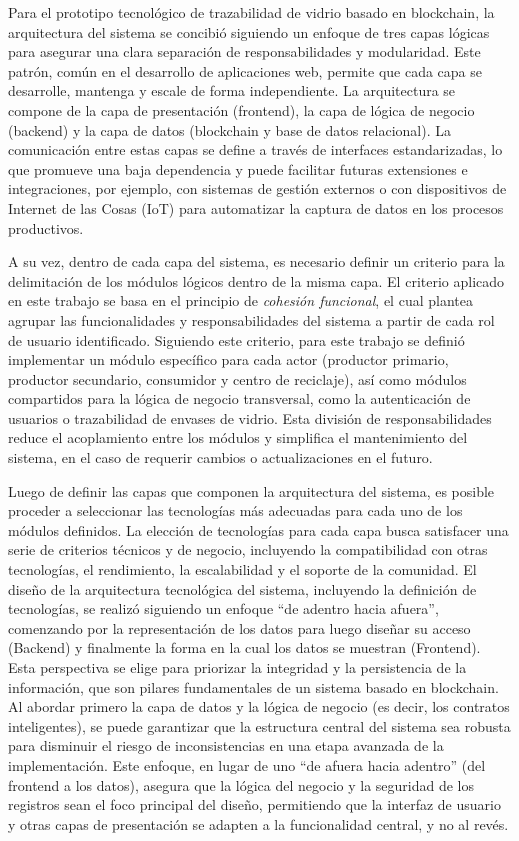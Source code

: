 Para el prototipo tecnológico de trazabilidad de vidrio basado en blockchain, la arquitectura del sistema se concibió siguiendo un enfoque de tres capas lógicas para asegurar una clara separación de responsabilidades y modularidad. Este patrón, común en el desarrollo de aplicaciones web, permite que cada capa se desarrolle, mantenga y escale de forma independiente. La arquitectura se compone de la capa de presentación (frontend), la capa de lógica de negocio (backend) y la capa de datos (blockchain y base de datos relacional). La comunicación entre estas capas se define a través de interfaces estandarizadas, lo que promueve una baja dependencia y puede facilitar futuras extensiones e integraciones, por ejemplo, con sistemas de gestión externos o con dispositivos de Internet de las Cosas (IoT) para automatizar la captura de datos en los procesos productivos.

A su vez, dentro de cada capa del sistema, es necesario definir un criterio para la delimitación de los módulos lógicos dentro de la misma capa. El criterio aplicado en este trabajo se basa en el principio de \textit{cohesión funcional}, el cual plantea agrupar las funcionalidades y responsabilidades del sistema a partir de cada rol de usuario identificado. Siguiendo este criterio, para este trabajo se definió implementar un módulo específico para cada actor (productor primario, productor secundario, consumidor y centro de reciclaje), así como módulos compartidos para la lógica de negocio transversal, como la autenticación de usuarios o trazabilidad de envases de vidrio. Esta división de responsabilidades reduce el acoplamiento entre los módulos y simplifica el mantenimiento del sistema, en el caso de requerir cambios o actualizaciones en el futuro.

Luego de definir las capas que componen la arquitectura del sistema, es posible proceder a seleccionar las tecnologías más adecuadas para cada uno de los módulos definidos. La elección de tecnologías para cada capa busca satisfacer una serie de criterios técnicos y de negocio, incluyendo la compatibilidad con otras tecnologías, el rendimiento, la escalabilidad y el soporte de la comunidad. El diseño de la arquitectura tecnológica del sistema, incluyendo la definición de tecnologías, se realizó siguiendo un enfoque ``de adentro hacia afuera'', comenzando por la representación de los datos para luego diseñar su acceso (Backend) y finalmente la forma en la cual los datos se muestran (Frontend). Esta perspectiva se elige para priorizar la integridad y la persistencia de la información, que son pilares fundamentales de un sistema basado en blockchain. Al abordar primero la capa de datos y la lógica de negocio (es decir, los contratos inteligentes), se puede garantizar que la estructura central del sistema sea robusta para disminuir el riesgo de inconsistencias en una etapa avanzada de la implementación. Este enfoque, en lugar de uno ``de afuera hacia adentro'' (del frontend a los datos), asegura que la lógica del negocio y la seguridad de los registros sean el foco principal del diseño, permitiendo que la interfaz de usuario y otras capas de presentación se adapten a la funcionalidad central, y no al revés.

